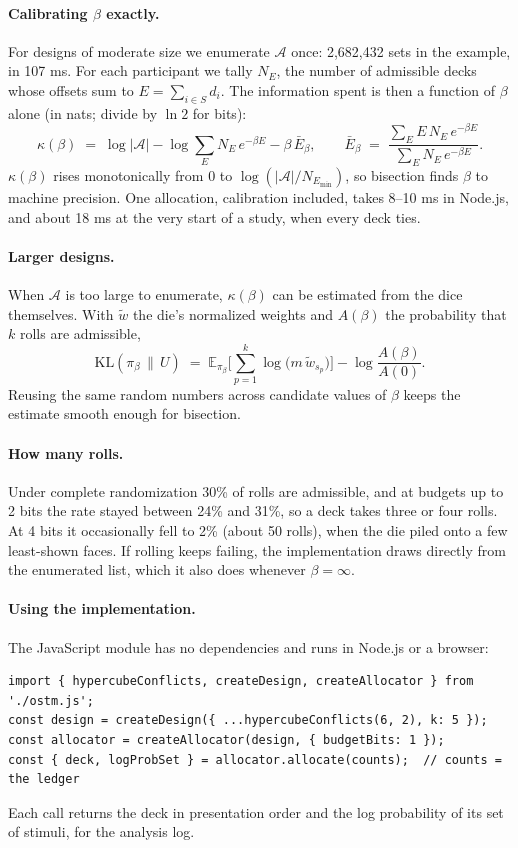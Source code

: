 \documentclass[11pt]{article}
\newcommand{\A}{\mathcal{A}}
\newcommand{\KL}{\mathrm{KL}}
\newcommand{\Unif}{U}
\newcommand{\E}{\mathbb{E}}
\begin{document}
\paragraph{Calibrating $\beta$ exactly.} For designs of moderate size we enumerate $\A$ once: 2,682,432 sets in the example, in 107 ms. For each participant we tally $N_E$, the number of admissible decks whose offsets sum to $E = \sum_{i\in S} d_i$. The information spent is then a function of $\beta$ alone (in nats; divide by $\ln 2$ for bits):
\begin{equation}\label{eq:calib}
\kappa(\beta) \;=\; \log|\A| - \log\sum_E N_E\,e^{-\beta E} - \beta\,\bar E_\beta,
\qquad \bar E_\beta \;=\; \frac{\sum_E E\,N_E\,e^{-\beta E}}{\sum_E N_E\,e^{-\beta E}}.
\end{equation}
$\kappa(\beta)$ rises monotonically from 0 to $\log(|\A|/N_{E_{\min}})$, so bisection finds $\beta$ to machine precision. One allocation, calibration included, takes 8--10 ms in Node.js, and about 18 ms at the very start of a study, when every deck ties.

\paragraph{Larger designs.} When $\A$ is too large to enumerate, $\kappa(\beta)$ can be estimated from the dice themselves. With $\tilde w$ the die's normalized weights and $A(\beta)$ the probability that $k$ rolls are admissible,
\begin{equation}
\KL(\pi_\beta\,\|\,\Unif) \;=\; \E_{\pi_\beta}\Big[\sum_{p=1}^{k}\log\big(m\,\tilde w_{s_p}\big)\Big] - \log\frac{A(\beta)}{A(0)}.
\end{equation}
Reusing the same random numbers across candidate values of $\beta$ keeps the estimate smooth enough for bisection.

\paragraph{How many rolls.} Under complete randomization 30\% of rolls are admissible, and at budgets up to 2 bits the rate stayed between 24\% and 31\%, so a deck takes three or four rolls. At 4 bits it occasionally fell to 2\% (about 50 rolls), when the die piled onto a few least-shown faces. If rolling keeps failing, the implementation draws directly from the enumerated list, which it also does whenever $\beta=\infty$.

\paragraph{Using the implementation.} The JavaScript module has no dependencies and runs in Node.js or a browser:
\begin{verbatim}
import { hypercubeConflicts, createDesign, createAllocator } from './ostm.js';
const design = createDesign({ ...hypercubeConflicts(6, 2), k: 5 });
const allocator = createAllocator(design, { budgetBits: 1 });
const { deck, logProbSet } = allocator.allocate(counts);  // counts = the ledger
\end{verbatim}
Each call returns the deck in presentation order and the log probability of its set of stimuli, for the analysis log.
\end{document}

